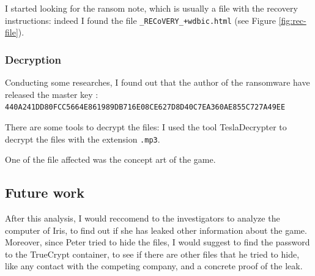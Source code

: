 \documentclass[12pt]{article}
\begin{document}
I started looking for the ransom note, which is usually a file with the recovery instructions: indeed I found the file \texttt{\_RECoVERY\_+wdbic.html} (see Figure \ref{fig:rec-file}).

\subsubsection{Decryption}
Conducting some researches, I found out that the author of the ransomware have released the master key \cite{teslacrypt-masterkey}: \\
\texttt{440A241DD80FCC5664E861989DB716E08CE627D8D40C7EA360AE855C727A49EE}

There are some tools to decrypt the files: I used the tool TeslaDecrypter \cite{tesla-decrypt} to decrypt the files with the extension \texttt{.mp3}.

One of the file affected was the concept art of the game.

\subsection{Future work}

After this analysis, I would reccomend to the investigators to analyze the computer of Iris, to find out if she has leaked other information about the game. Moreover, since Peter tried to hide the files, I would suggest to find the password to the TrueCrypt container, to see if there are other files that he tried to hide, like any contact with the competing company, and a concrete proof of the leak.

\printbibliography[title={References}]
\end{document}
